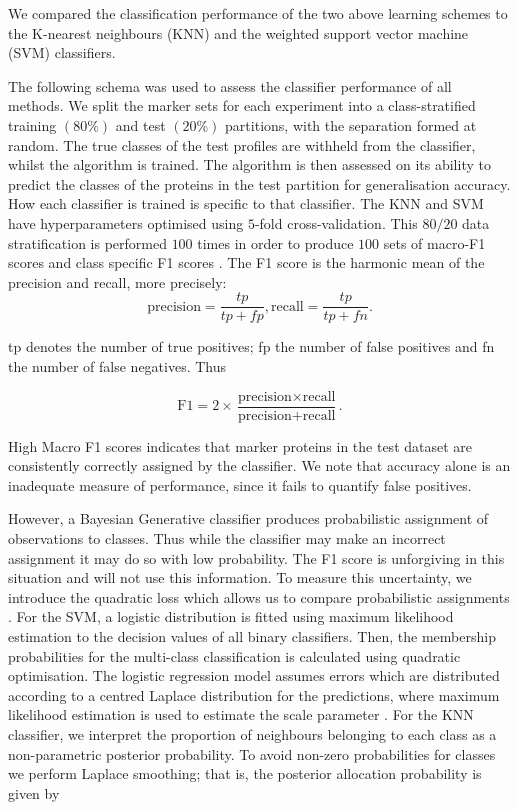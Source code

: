 \documentclass[10pt,letterpaper]{article}\usepackage[]{graphicx}\usepackage[]{color}
\begin{document}
We compared the classification performance of the two
above learning schemes to the K-nearest neighbours (KNN) and the
weighted support vector machine (SVM) classifiers.

The following schema was used to assess the classifier performance of
all methods. We split the marker sets for each experiment into a
class-stratified training $(80\%)$ and test $(20\%)$ partitions, with
the separation formed at random. The true classes of the test profiles
are withheld from the classifier, whilst the algorithm is trained. The
algorithm is then assessed on its ability to predict the classes of
the proteins in the test partition for generalisation accuracy. How
each classifier is trained is specific to that classifier.  The KNN
and SVM have hyperparameters optimised using $5$-fold
cross-validation. This $80/20$ data stratification is performed $100$
times in order to produce $100$ sets of macro-F1 \cite{He::2009}
scores and class specific F1 scores \cite{Breckels:2016}. The F1
score is the harmonic mean of the precision and recall, more
precisely:
\[\text{precision}=\frac{tp}{tp+fp}, \text{recall} = \frac{tp}{tp+fn}.\]

tp denotes the number of true positives; fp the number of
false positives and fn the number of false negatives. Thus

\[\text{F1}=2\times\frac{\text{precision}\times\text{recall}}{\text{precision}+\text{recall}}.\]

High Macro F1 scores indicates that marker proteins in the test
dataset are consistently correctly assigned by the classifier. We note
that accuracy alone is an inadequate measure of performance, since it
fails to quantify false positives.

However, a Bayesian Generative classifier produces probabilistic
assignment of observations to classes. Thus while the classifier may
make an incorrect assignment it may do so with low probability. The F1
score is unforgiving in this situation and will not use this
information.  To measure this uncertainty, we introduce the quadratic
loss which allows us to compare probabilistic assignments
\cite{Gneiting:2007}.  For the SVM, a logistic distribution is fitted
using maximum likelihood estimation to the decision values of all
binary classifiers. Then, the membership probabilities for the
multi-class classification is calculated using quadratic optimisation.
The logistic regression model assumes errors which are distributed
according to a centred Laplace distribution for the predictions, where
maximum likelihood estimation is used to estimate the scale parameter
\cite{Meyer:2017}.  For the KNN classifier, we interpret the
proportion of neighbours belonging to each class as a non-parametric
posterior probability. To avoid non-zero probabilities for classes we
perform Laplace smoothing; that is, the posterior allocation
probability is given by
\end{document}
